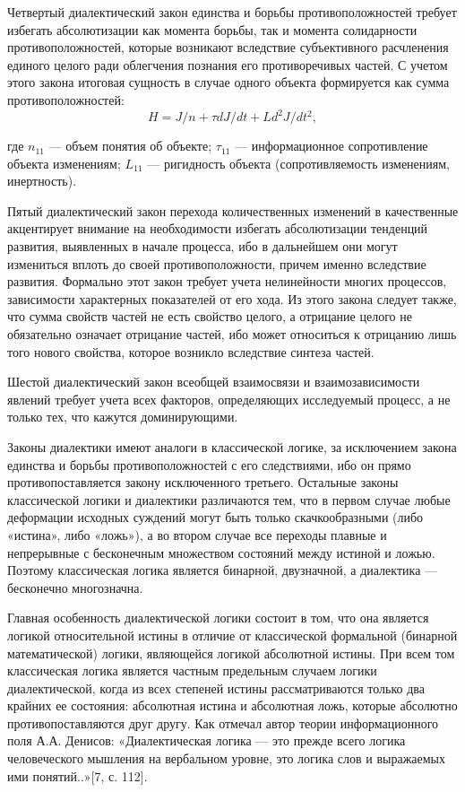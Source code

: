 \documentclass[a4paper,12pt]{report}
\begin{document}
     Четвертый диалектический закон единства и борьбы противоположностей требует избегать абсолютизации как момента борьбы, так и момента солидарности противоположностей, которые возникают вследствие субъективного расчленения единого целого ради облегчения познания его противоречивых частей. С учетом этого закона итоговая сущность
в случае одного объекта формируется как
сумма противоположностей:
\begin{equation}
\label{trivial}
H = J / n + \tau dJ / dt + Ld^2 J / dt^2 , 
\end{equation}	

где $n_11$ — объем понятия об объекте; $\tau_11$ —
информационное сопротивление объекта
изменениям; $L_11$ — ригидность объекта (сопротивляемость изменениям, инертность).
     
     Пятый диалектический закон перехода количественных изменений в качественные акцентирует внимание на необходимости избегать абсолютизации тенденций развития, выявленных в начале процесса, ибо в дальнейшем они могут измениться вплоть до своей противоположности, причем именно вследствие развития. Формально этот закон требует учета нелинейности многих процессов, зависимости характерных показателей от его хода.
Из этого закона следует также, что сумма свойств частей не есть свойство целого, а отрицание целого не обязательно означает отрицание частей, ибо может относиться к отрицанию лишь того нового свойства, которое возникло вследствие синтеза частей.

     Шестой диалектический закон всеобщей взаимосвязи и взаимозависимости явлений требует учета всех факторов, определяющих исследуемый процесс, а не только тех, что кажутся доминирующими.
     
 Законы диалектики имеют аналоги в классической логике, за исключением закона единства и борьбы противоположностей с его следствиями, ибо он прямо противопоставляется закону исключенного третьего. Остальные законы классической логики и диалектики различаются тем, что в первом случае любые деформации исходных суждений могут быть только скачкообразными (либо «истина», либо «ложь»), а во втором случае все переходы плавные и непрерывные с бесконечным множеством состояний между истиной и ложью. Поэтому классическая логика является бинарной, двузначной, а диалектика — бесконечно многозначна. 
 
 Главная особенность диалектической логики состоит в том, что она является логикой относительной истины в отличие от классической формальной (бинарной математической) логики, являющейся логикой абсолютной истины. При всем том классическая логика является частным предельным случаем логики диалектической, когда из всех степеней истины рассматриваются только два крайних ее состояния: абсолютная истина и абсолютная ложь, которые абсолютно противопоставляются друг другу. Как отмечал автор теории информационного поля А.А. Денисов: «Диалектическая логика — это прежде всего логика человеческого мышления на вербальном уровне, это логика слов и выражаемых ими понятий..»[7, с. 112].
	
\end{document}
